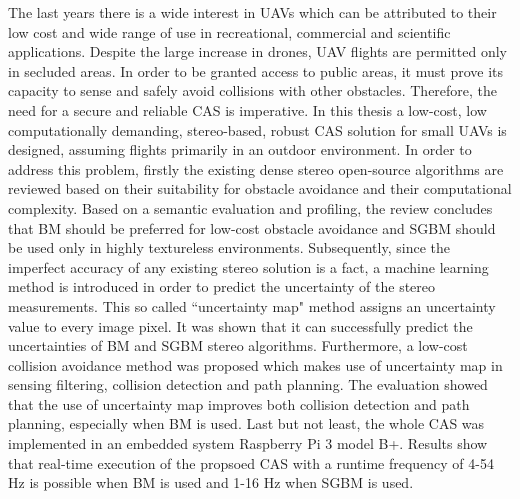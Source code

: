 The last years there is a wide interest in \acp{UAV} which can be attributed to their low cost and wide range of use in recreational, commercial and scientific applications. Despite the large increase in drones, \ac{UAV} flights are permitted only in secluded areas. In order to be granted access to public areas, it must prove its capacity to sense and safely avoid collisions with other obstacles. Therefore, the need for a secure and reliable \ac{CAS} is imperative. In this thesis a low-cost, low computationally demanding, stereo-based, robust \ac{CAS} solution for small \acp{UAV} is designed, assuming flights primarily in an outdoor environment. In order to address this problem, firstly the existing dense stereo open-source algorithms are reviewed based on their suitability for obstacle avoidance and their computational complexity. Based on a semantic evaluation and profiling, the review concludes that \ac{BM} should be preferred for low-cost obstacle avoidance and \ac{SGBM} should be used only in highly textureless environments. Subsequently, since the imperfect accuracy of any existing stereo solution is a fact, a machine learning method is introduced in order to predict the uncertainty of the stereo measurements. This so called ``uncertainty map" method assigns an uncertainty value to every image pixel. It was shown that it can successfully predict the uncertainties of \ac{BM} and \ac{SGBM} stereo algorithms. Furthermore, a low-cost collision avoidance method was proposed which makes use of uncertainty map in sensing filtering, collision detection and path planning. The evaluation showed that the use of uncertainty map improves both collision detection and path planning, especially when \ac{BM} is used. Last but not least, the whole \ac{CAS} was implemented in an embedded system Raspberry Pi 3 model B+. Results show that real-time execution of the propsoed \ac{CAS} with a runtime frequency of 4-54 Hz is possible when \ac{BM} is used and 1-16 Hz when \ac{SGBM} is used.